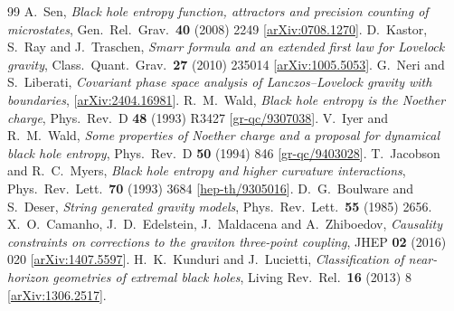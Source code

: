 \documentclass[11pt,a4paper]{article}
\begin{document}
\begin{thebibliography}{99}
  A.~Sen,
  \emph{Black hole entropy function, attractors and precision counting of
  microstates},
  Gen.\ Rel.\ Grav.\ \textbf{40} (2008) 2249
  [\href{https://arxiv.org/abs/0708.1270}{arXiv:0708.1270}].
  D.~Kastor, S.~Ray and J.~Traschen,
  \emph{Smarr formula and an extended first law for Lovelock gravity},
  Class.\ Quant.\ Grav.\ \textbf{27} (2010) 235014
  [\href{https://arxiv.org/abs/1005.5053}{arXiv:1005.5053}].
  G.~Neri and S.~Liberati,
  \emph{Covariant phase space analysis of Lanczos--Lovelock gravity with boundaries},
  [\href{https://arxiv.org/abs/2404.16981}{arXiv:2404.16981}].
  R.~M.~Wald,
  \emph{Black hole entropy is the Noether charge},
  Phys.\ Rev.\ D \textbf{48} (1993) R3427
  [\href{https://arxiv.org/abs/gr-qc/9307038}{gr-qc/9307038}].
  V.~Iyer and R.~M.~Wald,
  \emph{Some properties of Noether charge and a proposal for dynamical black
  hole entropy},
  Phys.\ Rev.\ D \textbf{50} (1994) 846
  [\href{https://arxiv.org/abs/gr-qc/9403028}{gr-qc/9403028}].
  T.~Jacobson and R.~C.~Myers,
  \emph{Black hole entropy and higher curvature interactions},
  Phys.\ Rev.\ Lett.\ \textbf{70} (1993) 3684
  [\href{https://arxiv.org/abs/hep-th/9305016}{hep-th/9305016}].
  D.~G.~Boulware and S.~Deser,
  \emph{String generated gravity models},
  Phys.\ Rev.\ Lett.\ \textbf{55} (1985) 2656.
  X.~O.~Camanho, J.~D.~Edelstein, J.~Maldacena and A.~Zhiboedov,
  \emph{Causality constraints on corrections to the graviton three-point
  coupling},
  JHEP \textbf{02} (2016) 020
  [\href{https://arxiv.org/abs/1407.5597}{arXiv:1407.5597}].
  H.~K.~Kunduri and J.~Lucietti,
  \emph{Classification of near-horizon geometries of extremal black holes},
  Living Rev.\ Rel.\ \textbf{16} (2013) 8
  [\href{https://arxiv.org/abs/1306.2517}{arXiv:1306.2517}].

\end{thebibliography}
\end{document}
